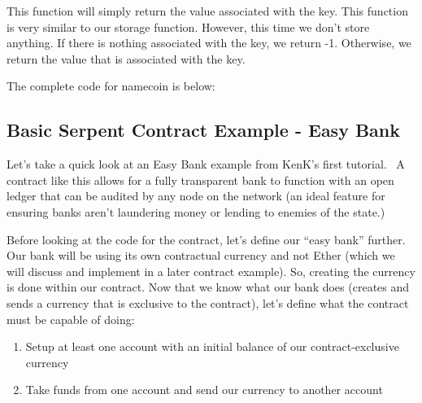 \documentclass[12pt]{article}
\begin{document}
This function will simply return the value associated with the key. This function is very similar to our storage function. However, this time we don't store anything. If there is nothing associated with the key, we return -1. Otherwise, we return the value that is associated with the key.

The complete code for namecoin is below:


\subsection{Basic Serpent Contract Example - Easy Bank}
Let's take a quick look at an Easy Bank example from KenK's first tutorial.~\cite{KenKsFirstContractTutorial} A contract like this allows for a fully transparent bank to function with an open ledger that can be audited by any node on the network (an ideal feature for ensuring banks aren't laundering money or lending to enemies of the state.)

Before looking at the code for the contract, let's define our ``easy bank'' further. Our bank will be using its own contractual currency and not Ether (which we will discuss and implement in a later contract example). So, creating the currency is done within our contract. Now that we know what our bank does (creates and sends a currency that is exclusive to the contract), let's define what the contract must be capable of doing:
\begin{enumerate}
\item Setup at least one account with an initial balance of our contract-exclusive currency
\item Take funds from one account and send our currency to another account
\end{enumerate}
\end{document}
